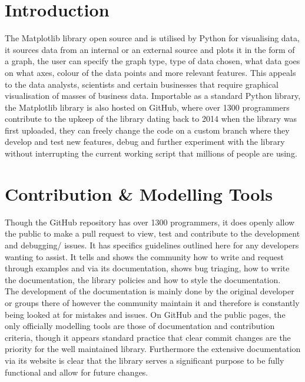 \documentclass[12pt, a4paper]{article}
\begin{document}

\pagestyle{plain}


\section{Introduction}
\label{Introduction Section}

The Matplotlib library \cite{GitHub} open source and is utilised by Python for visualising data, it sources data from an internal or an external source and plots it in the form of a graph, the user can specify the graph type, type of data chosen, what data goes on what axes, colour of the data points and more relevant features. This appeals to the data analysts, scientists and certain businesses that require graphical visualisation of masses of business data. Importable as a standard Python library, the Matplotlib library \cite{GitHub} is also hosted on GitHub, where over 1300 programmers contribute to the upkeep of the library dating back to 2014 when the library was first uploaded, they can freely change the code on a custom branch where they develop and test new features, debug and further experiment with the library without interrupting the current working script that millions of people are using. 

\section{Contribution \& Modelling Tools}
\label{Modelling Tools Section}

Though the GitHub repository has over 1300 programmers, it does openly allow the public to make a pull request to view, test and contribute to the development and debugging/ issues. It has specifics guidelines outlined here \cite{Contri} for any developers wanting to assist. It tells and shows the community how to write and request through examples and via its documentation, shows bug triaging, how to write the documentation, the library policies and how to style the documentation. \\ 

The development of the documentation is mainly done by the original developer or groups there of however the community maintain it and therefore is constantly being looked at for mistakes and issues. On GitHub and the public pages, the only officially modelling tools are those of documentation and contribution criteria, though it appears standard practice that clear commit changes are the priority for the well maintained library. Furthermore the extensive documentation via its website is clear that the library serves a significant purpose to be fully functional and allow for future changes.
\end{document}
